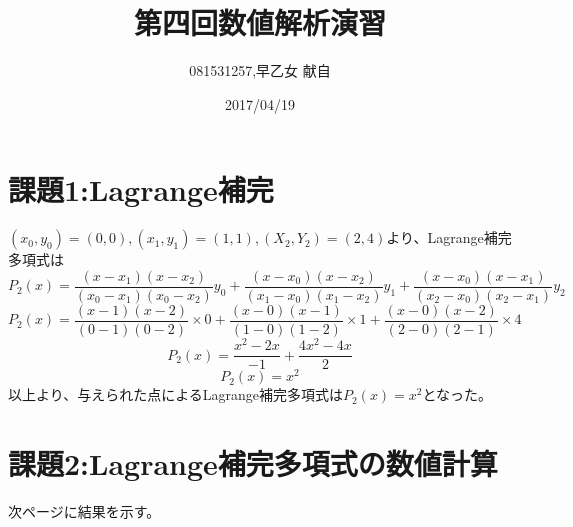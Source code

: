 \documentclass[]{jsarticle}
\title{第四回数値解析演習}
\author{081531257,早乙女 献自}
\date{2017/04/19}
\begin{document}
\maketitle
\section{課題1:Lagrange補完}
$(x_0,y_0)=(0,0),(x_1,y_1)=(1,1),(X_2,Y_2)=(2,4)$より、Lagrange補完多項式は
$$P_2(x)=\frac{(x-x_1)(x-x_2)}{(x_0-x_1)(x_0-x_2)}y_0+\frac{(x-x_0)(x-x_2)}{(x_1-x_0)(x_1-x_2)}y_1+\frac{(x-x_0)(x-x_1)}{(x_2-x_0)(x_2-x_1)}y_2$$
$$P_2(x)=\frac{(x-1)(x-2)}{(0-1)(0-2)}\times0+\frac{(x-0)(x-1)}{(1-0)(1-2)}\times1+\frac{(x-0)(x-2)}{(2-0)(2-1)}\times4$$
$$P_2(x)=\frac{x^2-2x}{-1}+\frac{4x^2-4x}{2}$$
$$P_2(x)=x^2$$
以上より、与えられた点によるLagrange補完多項式は$P_2(x)=x^2$となった。
\section{課題2:Lagrange補完多項式の数値計算}
次ページに結果を示す。
\end{document}
